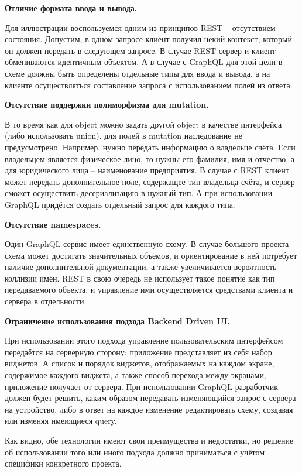 \textbf{Отличие формата ввода и вывода.}

Для иллюстрации воспользуемся одним из принципов REST – отсутствием состояния.
Допустим, в одном запросе клиент получил некий контекст, который он должен передать в следующем запросе.
В случае REST сервер и клиент обмениваются идентичным объектом.
А в случае с GraphQL для этой цели в схеме должны быть определены отдельные типы для ввода и вывода, а на клиенте осуществляться составление запроса с использованием полей из ответа.

\textbf{Отсутствие поддержки полиморфизма для mutation.}

В то время как для object можно задать другой object в качестве интерфейса (либо использовать union), для полей в mutation наследование не предусмотрено.
Например, нужно передать информацию о владельце счёта.
Если владельцем является физическое лицо, то нужны его фамилия, имя и отчество, а для юридического лица – наименование предприятия.
В случае с REST клиент может передать дополнительное поле, содержащее тип владельца счёта, и сервер сможет осуществить десериализацию в нужный тип.
А при использовании GraphQL придётся создать отдельный запрос для каждого типа.

\textbf{Отсутствие namespaces.}

Один GraphQL сервис имеет единственную схему.
В случае большого проекта схема может достигать значительных объёмов, и ориентирование в ней потребует наличие дополнительной документации, а также увеличивается вероятность коллизии имён.
REST в свою очередь не использует такое понятие как тип передаваемого объекта, и управление ими осуществляется средствами клиента и сервера в отдельности.

\textbf{Ограничение использования подхода Backend Driven UI.}

При использовании этого подхода управление пользовательским интерфейсом передаётся на серверную сторону: приложение представляет из себя набор виджетов.
А список и порядок виджетов, отображаемых на каждом экране, содержимое каждого виджета, а также способ перехода между экранами, приложение получает от сервера.
При использовании GraphQL разработчик должен будет решить, каким образом передавать изменяющийся запрос с сервера на устройство, либо в ответ на каждое изменение редактировать схему, создавая или изменяя имеющиеся query.

Как видно, обе технологии имеют свои преимущества и недостатки, но решение об использовании того или иного подхода должно приниматься с учётом специфики конкретного проекта.


